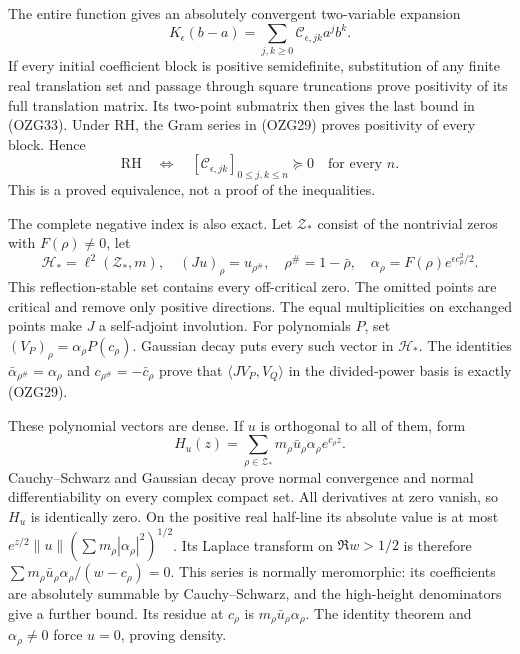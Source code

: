 \documentclass[
  10pt,
  a4paper,
]{article}
\begin{document}
The entire function gives an absolutely convergent two-variable
expansion \[
K_\epsilon(b-a)=\sum_{j,k\ge0}
\mathcal C_{\epsilon,jk}a^jb^k .
\tag{OZG35}
\] If every initial coefficient block is positive semidefinite,
substitution of any finite real translation set and passage through
square truncations prove positivity of its full translation matrix. Its
two-point submatrix then gives the last bound in (OZG33). Under RH, the
Gram series in (OZG29) proves positivity of every block. Hence \[
\mathrm{RH}\quad\Longleftrightarrow\quad
[\mathcal C_{\epsilon,jk}]_{0\le j,k\le n}\succeq0
\quad\text{for every }n.
\tag{OZG36}
\] This is a proved equivalence, not a proof of the inequalities.

The complete negative index is also exact. Let \(\mathcal Z_*\) consist
of the nontrivial zeros with \(F(\rho)\ne0\), let \[
\mathcal H_*=\ell^2(\mathcal Z_*,m),\quad
(Ju)_\rho=u_{\rho^\#},\quad \rho^\#=1-\bar\rho,\quad
\alpha_\rho=F(\rho)e^{\epsilon c_\rho^2/2}.
\tag{OZG37}
\] This reflection-stable set contains every off-critical zero. The
omitted points are critical and remove only positive directions. The
equal multiplicities on exchanged points make \(J\) a self-adjoint
involution. For polynomials \(P\), set
\((V_P)_\rho=\alpha_\rho P(c_\rho)\). Gaussian decay puts every such
vector in \(\mathcal H_*\). The identities
\(\bar\alpha_{\rho^\#}=\alpha_\rho\) and \(c_{\rho^\#}=-\bar c_\rho\)
prove that \(\langle JV_P,V_Q\rangle\) in the divided-power basis is
exactly (OZG29).

These polynomial vectors are dense. If \(u\) is orthogonal to all of
them, form \[
H_u(z)=\sum_{\rho\in\mathcal Z_*}
m_\rho\bar u_\rho\alpha_\rho e^{c_\rho z}.
\tag{OZG38}
\] Cauchy--Schwarz and Gaussian decay prove normal convergence and
normal differentiability on every complex compact set. All derivatives
at zero vanish, so \(H_u\) is identically zero. On the positive real
half-line its absolute value is at most
\(e^{z/2}\|u\|(\sum m_\rho|\alpha_\rho|^2)^{1/2}\). Its Laplace
transform on \(\Re w>1/2\) is therefore
\(\sum m_\rho\bar u_\rho\alpha_\rho/(w-c_\rho)=0\). This series is
normally meromorphic: its coefficients are absolutely summable by
Cauchy--Schwarz, and the high-height denominators give a further bound.
Its residue at \(c_\rho\) is \(m_\rho\bar u_\rho\alpha_\rho\). The
identity theorem and \(\alpha_\rho\ne0\) force \(u=0\), proving density.
\end{document}
